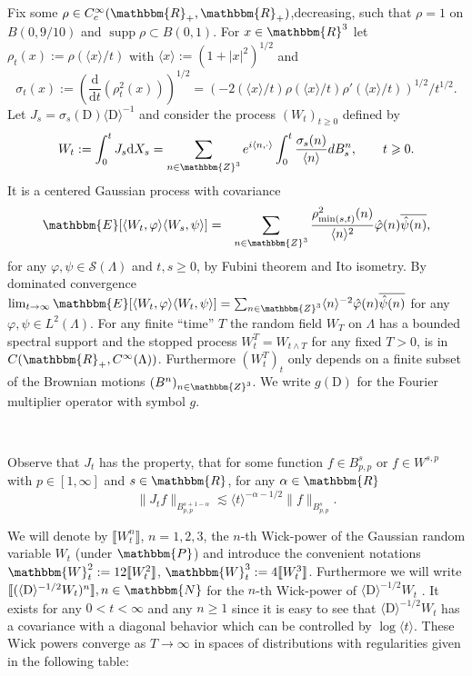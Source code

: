 \documentclass[11pt]{article}
\newcommand{\assign}{:=}
\newcommand{\mathD}{\mathrm{D}}
\newcommand{\mathd}{\mathrm{d}}
\newcommand{\nocomma}{}
\newcommand{\tmop}[1]{\ensuremath{\operatorname{#1}}}
\newcommand{\CS}{\mathscr{S}}
\begin{document}
Fix some $\rho \in C_c^{\infty} (\mathbbm{R}_+, \mathbbm{R}_+)$,decreasing,
such that $\rho = 1$ on $B (0, 9 / 10)$ and $\tmop{supp} \rho \subset B (0,
1)$. For $x \in \mathbbm{R}^3$ let $\rho_t (x) \assign \rho (\langle x \rangle
/ t)$ with $\langle x \rangle \assign (1 + | x |^2)^{1 / 2}$ and
\[ \sigma_t (x) \assign \left( \frac{\mathd}{\mathd t} (\rho^2_t (x))
   \right)^{1 / 2} = (- 2 (\langle x \rangle / t) \rho (\langle x \rangle / t)
   \rho' (\langle x \rangle / t))^{1 / 2} / t^{1 / 2} . \]
Let $J_s = \sigma_s (\mathD) \langle \mathD \rangle^{- 1}$ and consider the
process $(W_t)_{t \geqslant 0}$ defined by
\begin{equation}
  W_t \assign \int_0^t J_s \mathd X_s = \sum_{n \in \mathbbm{Z}^3} e^{i
  \langle n, \cdot \rangle} \int_0^t \frac{\sigma_s (n)}{\langle n \rangle} d
  B^n_s, \qquad t \geqslant 0. \label{eq:def-Y}
\end{equation}
It is a centered Gaussian process with covariance
\begin{eqnarray*}
  \mathbbm{E} [\langle W_t, \varphi \rangle \langle W_s, \psi \rangle] & = &
  \sum_{n \in \mathbbm{Z}^3} \frac{\rho_{\min (s, t)}^2 (n)}{\langle n
  \rangle^2} \hat{\varphi} (n) \overline{\hat{\psi} (n)},
\end{eqnarray*}
for any $\varphi, \psi \in \CS (\Lambda)$ and $t, s \geqslant 0$, by Fubini
theorem and Ito isometry. By dominated convergence $\lim_{t \rightarrow
\infty} \mathbbm{E} [\langle W_t, \varphi \rangle \langle W_t, \psi \rangle] =
\sum_{n \in \mathbbm{Z}^3} \langle n \rangle^{- 2} \hat{\varphi} (n)
\overline{\hat{\psi} (n)}$ for any $\varphi \nocomma, \psi \in L^2 (\Lambda)$.
For any finite ``time'' $T$ the random field $W_T$ on $\Lambda$ has a bounded
spectral support and the stopped process $W^T_t = W_{t \wedge T}$ for any
fixed $T > 0$, is in $C (\mathbbm{R}_+, C^{\infty} (\Lambda))$. Furthermore
$(W^T_t)_t$ only depends on a finite subset of the Brownian motions $(B^n)_{n
\in \mathbbm{Z}^3}$. We write $g (\mathD)$ for the Fourier multiplier operator
with symbol $g$.

\

Observe that $J_t$ has the property, that for some function $f \in B_{p,
p}^s$ or $f \in W_{}^{s, p}$ with $p \in [1, \infty]$ and $s \in \mathbbm{R}$,
for any $\alpha \in \mathbbm{R}$
\[ \| J_t f \|_{B_{p, p}^{s + 1 - \alpha}} \lesssim \langle t \rangle^{-
   \alpha - 1 / 2} \| f \|_{B_{p, p}^s} . \]


We will denote by $\llbracket W^n_t \rrbracket$, $n = 1, 2, 3$, the $n$-th
Wick-power of the Gaussian random variable $W_t$ (under $\mathbbm{P}$) and
introduce the convenient notations $\mathbbm{W}_t^2 \assign 12 \llbracket
W^2_t \rrbracket$, $\mathbbm{W}_t^3 \assign 4 \llbracket W_t^3 \rrbracket$.
Furthermore we will write $\llbracket (\langle \mathD \rangle^{- 1 / 2} W_t)^n
\rrbracket, n \in \mathbbm{N}$ for the $n$-th Wick-power of $\langle \mathD
\rangle^{- 1 / 2} W_t$ . It exists for any $0 < t < \infty$ and any $n
\geqslant 1$ since it is easy to see that $\langle \mathD \rangle^{- 1 / 2}
W_t$ has a covariance with a diagonal behavior which can be controlled by
$\log \langle t \rangle$. These Wick powers converge as $T \rightarrow \infty$
in spaces of distributions with regularities given in the following table:
\end{document}
